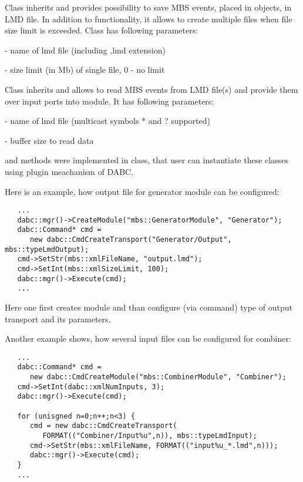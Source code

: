Class  inherits  and provides possibility to save 
MBS events, placed in  objects, in LMD file. 
In addition to  functionality, it allows to create
multiple files when file size limit is exceeded. Class has following parameters:
\bbul
\item {}      - name of lmd file (including .lmd extension)  
\item {} - size limit (in Mb) of single file, 0 - no limit
\ebul

Class  inherits  and allows to read 
MBS events from LMD file(s) and provide them over input ports into module. 
It has following parameters:
\bbul
\item {} - name of lmd file (multicast symbols * and ? supported)  
\item {}  - buffer size to read data
\ebul

 and  methods were implemented in  class, 
that user can instantiate these classes using plugin meachanism of DABC. 
  

Here is an example, how output file for generator module can be configured:
   
\begin{small}
\begin{verbatim}
   ...
   dabc::mgr()->CreateModule("mbs::GeneratorModule", "Generator");
   dabc::Command* cmd = 
      new dabc::CmdCreateTransport("Generator/Output", mbs::typeLmdOutput);
   cmd->SetStr(mbs::xmlFileName, "output.lmd");
   cmd->SetInt(mbs::xmlSizeLimit, 100);
   dabc::mgr()->Execute(cmd);
   ...
\end{verbatim}
\end{small}
       
Here one first creates module and than configure (via command) type of
output transport and its parameters.        
       
Another example shows, how several input files can be configured for combiner:
   
\begin{small}
\begin{verbatim}
   ...
   dabc::Command* cmd = 
      new dabc::CmdCreateModule("mbs::CombinerModule", "Combiner");
   cmd->SetInt(dabc::xmlNumInputs, 3);
   dabc::mgr()->Execute(cmd);
   
   for (unisgned n=0;n++;n<3) {
      cmd = new dabc::CmdCreateTransport(
         FORMAT(("Combiner/Input%u",n)), mbs::typeLmdInput);
      cmd->SetStr(mbs::xmlFileName, FORMAT(("input%u_*.lmd",n)));
      dabc::mgr()->Execute(cmd);
   }   
   ...
\end{verbatim}
\end{small}

